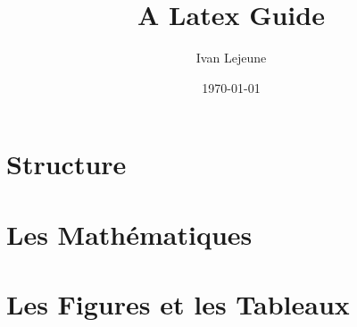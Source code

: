 \documentclass[french,a4paper,10pt]{article}
\title{\color{astral} \sffamily \bfseries A Latex Guide}
\author{Ivan Lejeune}
\date{\today}
\begin{document}
    
    \newpage

    \tableofcontents\label{toc}
    \newpage

    
    \newpage

    
    \newpage

    \section{Structure}\label{sec:structure}
    
    \newpage

    \section{Les Mathématiques}\label{sec:math}
    
    \newpage

    \section{Les Figures et les Tableaux}\label{sec:figures}
    
    \newpage

% 
% 
% 
% 
% 
\end{document}
